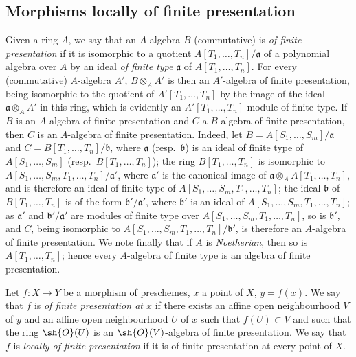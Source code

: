 \subsection{Morphisms locally of finite presentation}
\label{subsection:IV.1.4}

\begin{env}[1.4.1]
\label{IV.1.4.1}
Given a ring $A$, we say that an $A$-algebra $B$ (commutative) is \emph{of finite presentation} if it is isomorphic to a quotient $A[T_1,\ldots,T_n]/\mathfrak{a}$ of a polynomial algebra over $A$ by an ideal \emph{of finite type} $\mathfrak{a}$ of $A[T_1,\ldots,T_n]$.
For every (commutative) $A$-algebra $A'$, $B\otimes_A A'$ is then an $A'$-algebra of finite presentation, being isomorphic to the quotient of $A'[T_1,\ldots,T_n]$ by the image of the ideal $\mathfrak{a}\otimes_A A'$ in this ring, which is evidently an $A'[T_1,\ldots,T_n]$-module of finite type.
If $B$ is an $A$-algebra of finite presentation and $C$ a $B$-algebra of finite presentation, then $C$ is an $A$-algebra of finite presentation.
Indeed, let $B = A[S_1,\ldots,S_m]/\mathfrak{a}$ and $C = B[T_1,\ldots,T_n]/\mathfrak{b}$, where $\mathfrak{a}$ (resp.~$\mathfrak{b}$) is an ideal of finite type of $A[S_1,\ldots,S_m]$ (resp.~$B[T_1,\ldots,T_n]$); the ring $B[T_1,\ldots,T_n]$ is isomorphic to $A[S_1,\ldots,S_m,T_1,\ldots,T_n]/\mathfrak{a}'$, where $\mathfrak{a}'$ is the canonical image of $\mathfrak{a}\otimes_A A[T_1,\ldots,T_n]$, and is therefore an ideal of finite type of $A[S_1,\ldots,S_m,T_1,\ldots,T_n]$; the ideal $\mathfrak{b}$ of $B[T_1,\ldots,T_n]$ is of the form $\mathfrak{b}'/\mathfrak{a}'$, where $\mathfrak{b}'$ is an ideal of $A[S_1,\ldots,S_m,T_1,\ldots,T_n]$; as $\mathfrak{a}'$ and $\mathfrak{b}'/\mathfrak{a}'$ are modules of finite type over $A[S_1,\ldots,S_m,T_1,\ldots,T_n]$, so is $\mathfrak{b}'$, and $C$, being isomorphic to $A[S_1,\ldots,S_m,T_1,\ldots,T_n]/\mathfrak{b}'$, is therefore an $A$-algebra of finite presentation.
We note finally that if $A$ is \emph{Noetherian}, then so is $A[T_1,\ldots,T_n]$; hence every $A$-algebra of finite type is an algebra of finite presentation.
\end{env}

\begin{definition}[1.4.2]
\label{IV.1.4.2}
Let $f:X\to Y$ be a morphism of preschemes, $x$ a point of $X$, $y=f(x)$.
We say that $f$ is \emph{of finite presentation at $x$} if there exists an affine open neighbourhood $V$ of $y$ and an affine open neighbourhood $U$ of $x$ such that $f(U)\subset V$ and such that the ring $\sh{O}(U)$ is an $\sh{O}(V)$-algebra of finite presentation.
We say that $f$ is \emph{locally of finite presentation} if it is of finite presentation at every point of $X$.
\end{definition}


